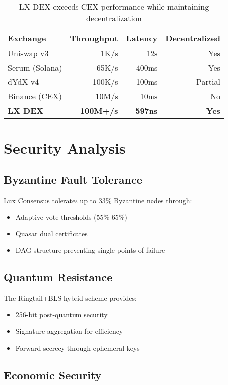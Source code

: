 \documentclass[11pt,a4paper]{article}
\begin{document}
\begin{table}[H]
\centering
\begin{tabular}{lrrr}
\toprule
\textbf{Exchange} & \textbf{Throughput} & \textbf{Latency} & \textbf{Decentralized} \\
\midrule
Uniswap v3 & 1K/s & 12s & Yes \\
Serum (Solana) & 65K/s & 400ms & Yes \\
dYdX v4 & 100K/s & 100ms & Partial \\
Binance (CEX) & 10M/s & 10ms & No \\
\textbf{LX DEX} & \textbf{100M+/s} & \textbf{597ns} & \textbf{Yes} \\
\bottomrule
\end{tabular}
\caption{LX DEX exceeds CEX performance while maintaining decentralization}
\end{table}

\section{Security Analysis}

\subsection{Byzantine Fault Tolerance}

Lux Consensus tolerates up to 33\% Byzantine nodes through:
\begin{itemize}
    \item Adaptive vote thresholds (55\%-65\%)
    \item Quasar dual certificates
    \item DAG structure preventing single points of failure
\end{itemize}

\subsection{Quantum Resistance}

The Ringtail+BLS hybrid scheme provides:
\begin{itemize}
    \item 256-bit post-quantum security
    \item Signature aggregation for efficiency
    \item Forward secrecy through ephemeral keys
\end{itemize}

\subsection{Economic Security}
\end{document}
